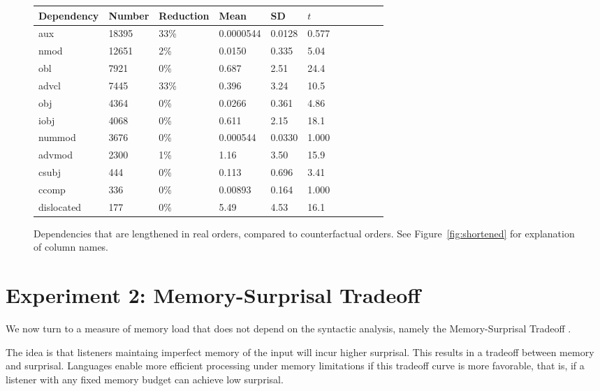 \documentclass[11pt,a4paper]{article}
\begin{document}
\begin{figure}
\begin{center}
\begin{tabular}{l|llllllllll}
   Dependency  &Number &Reduction     &  Mean   &   SD &       $t$ \\ \hline
  aux      &    18395  &  33\% &  0.0000544  &0.0128 &   0.577 \\
 nmod         &12651  &  2\%&  0.0150     &0.335  &   5.04  \\
 obl          & 7921  &  0\%     &  0.687      &2.51&     24.4   \\
  advcl        & 7445  &  33\% &  0.396      &3.24  &   10.5   \\
 obj          & 4364  &  0\%     &  0.0266     &0.361 &    4.86  \\
 iobj         & 4068  &  0\%    &  0.611      &2.15  &   18.1   \\
 nummod       & 3676  &  0\%     &  0.000544   &0.0330&    1.000 \\
 advmod       & 2300  &  1\%&  1.16       &3.50  &   15.9   \\
 csubj        &  444  &  0\%    &   0.113      &0.696 &    3.41  \\
 ccomp        &  336  &  0\%    &   0.00893    &0.164 &    1.000 \\
 dislocated   &  177  &  0\%    &   5.49       &4.53  &   16.1   \\
\end{tabular}
\end{center}
\caption{Dependencies that are lengthened in real orders, compared to counterfactual orders. See Figure~\ref{fig:shortened} for explanation of column names.}\label{fig:lengthened}
\end{figure}



\section{Experiment 2: Memory-Surprisal Tradeoff}

We now turn to a measure of memory load that does not depend on the syntactic analysis, namely the Memory-Surprisal Tradeoff \citep{hahn2019memory}.

The idea is that listeners maintaing imperfect memory of the input will incur higher surprisal.
This results in a tradeoff between memory and surprisal.
Languages enable more efficient processing under memory limitations if this tradeoff curve is more favorable, that is, if a listener with any fixed memory budget can achieve low surprisal.
\end{document}
